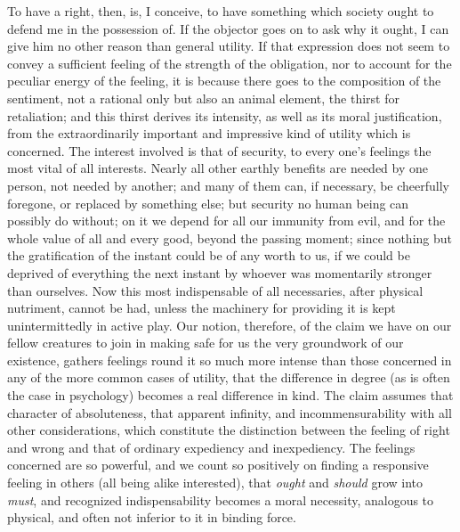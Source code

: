 \documentclass[12pt]{report}
\begin{document}
To have a right, then, is, I conceive, to have something which society ought to defend me in the possession of. If the objector goes on to ask why it ought, I can give him no other reason than general utility. If that expression does not seem to convey a sufficient feeling of the strength of the obligation, nor to account for the peculiar energy of the feeling, it is because there goes to the composition of the sentiment, not a rational only but also an animal element, the thirst for retaliation; and this thirst derives its intensity, as well as its moral justification, from the extraordinarily important and impressive kind of utility which is concerned. The interest involved is that of security, to every one's feelings the most vital of all interests. Nearly all other earthly benefits are needed by one person, not needed by another; and many of them can, if necessary, be cheerfully foregone, or replaced by something else; but security no human being can possibly do without; on it we depend for all our immunity from evil, and for the whole value of all and every good, beyond the passing moment; since nothing but the gratification of the instant could be of any worth to us, if we could be deprived of everything the next instant by whoever was momentarily stronger than ourselves. Now this most indispensable of all necessaries, after physical nutriment, cannot be had, unless the machinery for providing it is kept unintermittedly in active play. Our notion, therefore, of the claim we have on our fellow creatures to join in making safe for us the very groundwork of our existence, gathers feelings round it so much more intense than those concerned in any of the more common cases of utility, that the difference in degree (as is often the case in psychology) becomes a real difference in kind. The claim assumes that character of absoluteness, that apparent infinity, and incommensurability with all other considerations, which constitute the distinction between the feeling of right and wrong and that of ordinary expediency and inexpediency. The feelings concerned are so powerful, and we count so positively on finding a responsive feeling in others (all being alike interested), that \emph{ought} and \emph{should} grow into \emph{must}, and recognized indispensability becomes a moral necessity, analogous to physical, and often not inferior to it in binding force.
\end{document}
